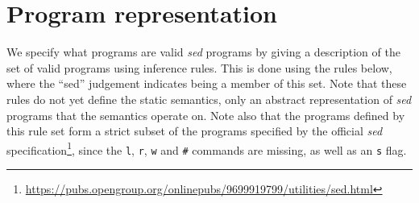 \documentclass[11pt]{article}
\newcommand\SED{\emph{sed}}
\begin{document}
\section{Program representation}

We specify what programs are valid \SED{} programs by giving a description of the set of valid programs using inference rules.
This is done using the rules below, where the ``sed'' judgement indicates being a member of this set.
Note that these rules do not yet define the static semantics, only an abstract representation of \SED{} programs that the semantics operate on.
Note also that the programs defined by this rule set form a strict subset of the programs specified by the official \SED{} specification\footnote{\url{https://pubs.opengroup.org/onlinepubs/9699919799/utilities/sed.html}}, since the \texttt{l}, \texttt{r}, \texttt{w} and \texttt{\#} commands are missing, as well as an \texttt{s} flag.
\end{document}
